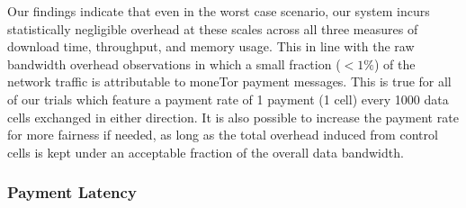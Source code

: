Our findings indicate that even in the worst case scenario, our system incurs
statistically negligible overhead at these scales across all three measures of
download time, throughput, and memory usage. This in line with the raw bandwidth
overhead observations in which a small fraction ($< 1\%$) of the network traffic
is attributable to moneTor payment messages. This is true for all of our trials
which feature a payment rate of 1 payment (1 cell) every 1000 data cells
exchanged in either direction. It is also possible to increase the payment rate
for more fairness if needed, as long as the total overhead induced from control
cells is kept under an acceptable fraction of the overall data bandwidth. 


\subsubsection{Payment Latency}

